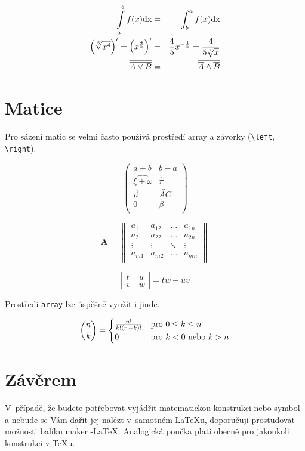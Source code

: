 \documentclass[a4paper,11pt]{article}
\begin{document}
	\begin{eqnarray}
	\int\limits_a^b f(x)\textup{dx}&=&-\int_b^a f(x)\textup{dx}\\
	\left(\sqrt[5]{x^4}\right)^\prime=\left(x^{\frac{4}{5}}\right)^
	\prime&=&\frac{4}{5}x^{-\frac{1}{5}}=\frac{4}{5\sqrt[5]{x}}\\
	\overline{\overline{A\vee B}}&=&\overline{\overline{A}\wedge\overline{B}}
	\end{eqnarray}

	\section{Matice}
	
	Pro sázení matic se velmi často používá prostředí array a závorky (\verb$\left$, \verb$\right$).\par
	
	$$\left(
	\begin{array}{cc}
	{a+b} & {b-a}\\
	\widehat{\xi+\omega} & \hat{\pi}\\
	\vec{a} & \overleftrightarrow{AC}\\
	0 & {\beta}\\
	\end{array}
	\right)$$
	
	
	$$\textbf{A}=\left\|
	\begin{array}{cccc}
	a_{11}&a_{12}&\ldots&a_{1n}\\
	a_{21}&a_{22}&\ldots&a_{2n}\\
	\vdots&\vdots&\ddots&\vdots\\
	a_{m1}&a_{m2}&\ldots&a_{mn}\\
	\end{array}
	\right\|$$
	
	$$\left|
	\begin{array}{cc}
	t & u\\
	v~& w
	\end{array}
	\right| =tw - uv $$
	
	Prostředí \verb|array| lze úspěšně využít i jinde.\par
	
	$$\binom{n}{k} = \begin{cases} \frac{n!}{k!(n-k)!} &  
	\textup{pro}\ 0\leq k\leq n \\ 0 &  \textup{pro\ $k<0$\ nebo}\ k>n \end{cases}$$

	\section{Závěrem}
	
	V~případě, že budete potřebovat vyjádřit matematickou konstrukci 
	nebo symbol a nebude se Vám dařit jej nalézt v~samotném \LaTeX u, 
	doporučuji prostudovat možnosti balíku maker \AmS-\LaTeX.
	Analogická poučka platí obecně pro jakoukoli konstrukci v TeXu.
	
\end{document}
